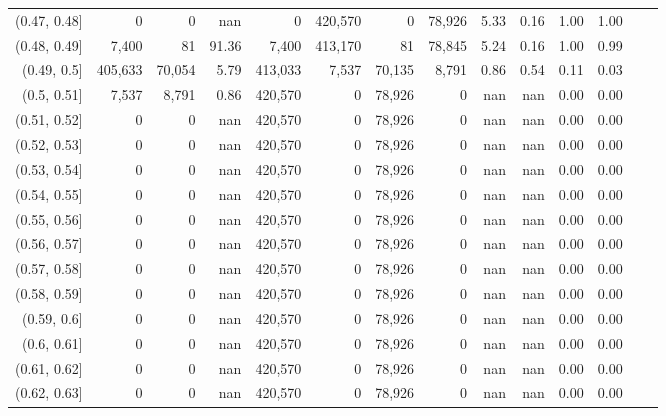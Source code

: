 \begin{tabular}{rrrrrrrrrrrrrr}
(0.47, 0.48]   &        0 &       0 &    nan &        0 &  420,570 &       0 &  78,926 &  5.33 &  0.16 &  1.00 &      1.00 \\
(0.48, 0.49]   &    7,400 &      81 &  91.36 &    7,400 &  413,170 &      81 &  78,845 &  5.24 &  0.16 &  1.00 &      0.99 \\
(0.49, 0.5]    &  405,633 &  70,054 &   5.79 &  413,033 &    7,537 &  70,135 &   8,791 &  0.86 &  0.54 &  0.11 &      0.03 \\
(0.5, 0.51]    &    7,537 &   8,791 &   0.86 &  420,570 &        0 &  78,926 &       0 &   nan &   nan &  0.00 &      0.00 \\
(0.51, 0.52]   &        0 &       0 &    nan &  420,570 &        0 &  78,926 &       0 &   nan &   nan &  0.00 &      0.00 \\
(0.52, 0.53]   &        0 &       0 &    nan &  420,570 &        0 &  78,926 &       0 &   nan &   nan &  0.00 &      0.00 \\
(0.53, 0.54]   &        0 &       0 &    nan &  420,570 &        0 &  78,926 &       0 &   nan &   nan &  0.00 &      0.00 \\
(0.54, 0.55]   &        0 &       0 &    nan &  420,570 &        0 &  78,926 &       0 &   nan &   nan &  0.00 &      0.00 \\
(0.55, 0.56]   &        0 &       0 &    nan &  420,570 &        0 &  78,926 &       0 &   nan &   nan &  0.00 &      0.00 \\
(0.56, 0.57]   &        0 &       0 &    nan &  420,570 &        0 &  78,926 &       0 &   nan &   nan &  0.00 &      0.00 \\
(0.57, 0.58]   &        0 &       0 &    nan &  420,570 &        0 &  78,926 &       0 &   nan &   nan &  0.00 &      0.00 \\
(0.58, 0.59]   &        0 &       0 &    nan &  420,570 &        0 &  78,926 &       0 &   nan &   nan &  0.00 &      0.00 \\
(0.59, 0.6]    &        0 &       0 &    nan &  420,570 &        0 &  78,926 &       0 &   nan &   nan &  0.00 &      0.00 \\
(0.6, 0.61]    &        0 &       0 &    nan &  420,570 &        0 &  78,926 &       0 &   nan &   nan &  0.00 &      0.00 \\
(0.61, 0.62]   &        0 &       0 &    nan &  420,570 &        0 &  78,926 &       0 &   nan &   nan &  0.00 &      0.00 \\
(0.62, 0.63]   &        0 &       0 &    nan &  420,570 &        0 &  78,926 &       0 &   nan &   nan &  0.00 &      0.00 \\

\end{tabular}
